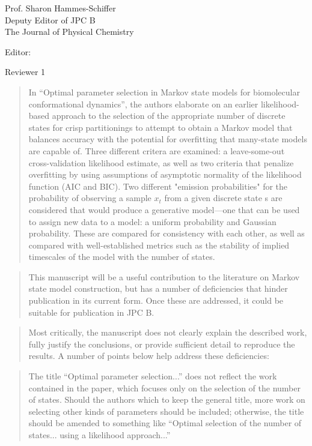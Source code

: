 \documentclass{letter}
\begin{document}
\begin{letter}{Prof. Sharon Hammes-Schiffer \\ Deputy Editor of JPC B \\ The Journal of Physical Chemistry}
\opening{Editor:}

Reviewer 1

\begin{quote}
In ``Optimal parameter selection in Markov state models for biomolecular conformational dynamics'', the authors elaborate on an earlier likelihood-based approach to the selection of the appropriate number of discrete states for crisp partitionings to attempt to obtain a Markov model that balances accuracy with the potential for overfitting that many-state models are capable of.  Three different critera are examined: a leave-some-out cross-validation likelihood estimate, as well as two criteria that penalize overfitting by using assumptions of asymptotic normality of the likelihood function (AIC and BIC).  Two different "emission probabilities" for the probability of observing a sample $x_t$ from a given discrete state s are considered that would produce a generative model---one that can be used to assign new data to a model: a uniform probability and Gaussian probability.  These are compared for consistency with each other, as well as compared with well-established metrics such as the stability of implied timescales of the model with the number of states.
\end{quote}

\begin{quote}
 This manuscript will be a useful contribution to the literature on Markov state model construction, but has a number of deficiencies that hinder publication in its current form.  Once these are addressed, it could be suitable for publication in JPC B.
\end{quote}

\begin{quote}
Most critically, the manuscript does not clearly explain the described work, fully justify the conclusions, or provide sufficient detail to reproduce the results.  A number of points below help address these deficiencies:
\end{quote}

\begin{quote}
The title ``Optimal parameter selection...'' does not reflect the work contained in the paper, which focuses only on the selection of the number of states.  Should the authors which to keep the general title, more work on selecting other kinds of parameters should be included; otherwise, the title should be amended to something like ``Optimal selection of the number of states... using a likelihood approach...''
\end{quote}


\end{letter}
\end{document}
